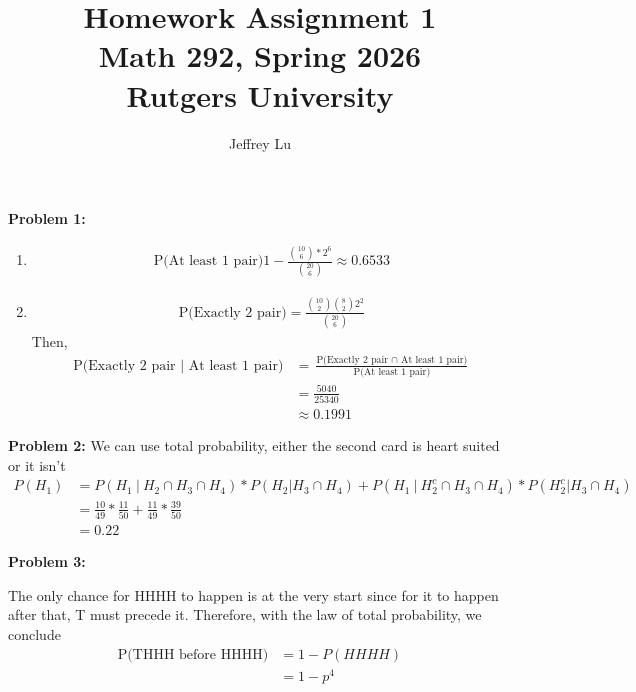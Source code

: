 \documentclass[12pt]{article}
\title{Homework Assignment 1 \\ \large Math 292, Spring 2026 \\ Rutgers University}
\author{Jeffrey Lu}
\begin{document}
\maketitle

\noindent \textbf{Problem 1:}

\begin{enumerate}
      \item[(a)]
            \begin{align*}
                  \text{P(At least 1 pair)}1 - \frac{\binom{10}{6} * 2^6}{\binom{20}{6}} \approx{0.6533}
            \end{align*}
      \item[(b)]
            \begin{align*}
                  \text{P(Exactly 2 pair)} = \frac{\binom{10}{2}\binom{8}{2}2^2}{\binom{20}{6}}
            \end{align*}
            Then,
            \begin{align*}
                  \text{P(Exactly 2 pair $|$ At least 1 pair)} & = \frac{\text{P(Exactly 2 pair $\cap$ At least 1 pair)}}{\text{P(At least 1 pair)}} \\
                                                               & = \frac{5040}{25340}                                                                \\
                                                               & \approx{0.1991}
            \end{align*}

\end{enumerate}

\noindent \textbf{Problem 2:}
We can use total probability, either the second card is heart suited or it isn't
\begin{align*}
      P(H_1) & =  P(H_1~|~H_2 \cap{} H_3  \cap{} H_4) * P(H_2 | H_3 \cap{} H_4) + P(H_1~|~H_2^c \cap{} H_3  \cap{} H_4) * P(H_2^c | H_3 \cap{} H_4) \\
             & = \frac{10}{49}*\frac{11}{50} + \frac{11}{49}*\frac{39}{50}                                                                          \\
             & = 0.22
\end{align*}


\noindent \textbf{Problem 3:}

The only chance for HHHH to happen is at the very start since for it to happen after that, T must precede it. Therefore, with the law of total probability, we conclude
\begin{align*}
      \text{P(THHH before HHHH)} & = 1 - P(HHHH) \\ &= 1 - p^4
\end{align*}
\end{document}
